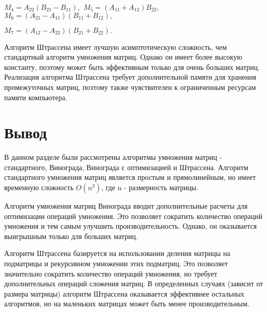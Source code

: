 $M_4 = A_{22}(B_{21} - B_{11}),$
$M_5 = (A_{11} + A_{12})B_{22},$
$M_6 = (A_{21} - A_{11})(B_{11} + B_{12}),$

$M_7 = (A_{12} - A_{22})(B_{21} + B_{22}).$

Алгоритм Штрассена имеет лучшую асимптотическую сложность, чем стандартный алгоритм умножения матриц. Однако он имеет более высокую константу, поэтому может быть эффективным только для очень больших матриц. Реализация алгоритма Штрассена требует дополнительной памяти для хранения промежуточных матриц, поэтому также чувствителен к ограниченным ресурсам памяти компьютера.


\section{Вывод}
В данном разделе были рассмотрены алгоритмы умножения матриц - стандартного, Винограда, Винограда с оптимизацией и Штрассена.
Алгоритм стандартного умножения матриц является простым и прямолинейным, но имеет временную сложность $O(n^3)$, где n - размерность матрицы.

Алгоритм умножения матриц Винограда вводит дополнительные расчеты для оптимизации операций умножения. Это позволяет сократить количество операций умножения и тем самым улучшить производительность. Однако, он оказывается выигрышным только для больших матриц.

Алгоритм Штрассена базируется на использовании деления матрицы на подматрицы и рекурсивном умножении этих подматриц. Это позволяет значительно сократить количество операций умножения, но требует дополнительных операций сложения матриц. В определенных случаях (зависит от размера матрицы) алгоритм Штрассена оказывается эффективнее остальных алгоритмов, но на маленьких матрицах может быть менее производительным.

